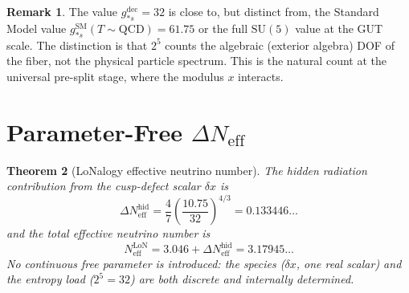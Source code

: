 \documentclass[12pt]{article}
\theoremstyle{plain}
\newtheorem{theorem}{Theorem}[section]
\theoremstyle{definition}
\newtheorem{remark}[theorem]{Remark}
\numberwithin{equation}{section}
\newcommand{\eff}{\mathrm{eff}}
\newcommand{\LoN}{\mathrm{LoN}}
\newcommand{\hid}{\mathrm{hid}}
\newcommand{\dec}{\mathrm{dec}}
\begin{document}
\begin{remark}
The value $g_{*s}^{\dec}=32$ is close to, but distinct from, the Standard
Model value $g_{*s}^{\mathrm{SM}}(T\sim\mathrm{QCD})=61.75$ or the
full $\mathrm{SU}(5)$ value at the GUT scale.  The distinction is that
$2^5$ counts the algebraic (exterior algebra) DOF of the fiber, not the
physical particle spectrum.  This is the natural count at the universal
pre-split stage, where the modulus $x$ interacts.
\end{remark}


\section{Parameter-Free $\Delta N_{\eff}$}\label{sec:Neff}

\begin{theorem}[LoNalogy effective neutrino number]\label{thm:Neff}
The hidden radiation contribution from the cusp-defect scalar
$\delta x$ is
\begin{equation}\label{eq:dNeff}
\boxed{\Delta N_{\eff}^{\hid} = \frac{4}{7}\left(\frac{10.75}{32}\right)^{4/3}
= 0.133446\ldots}
\end{equation}
and the total effective neutrino number is
\begin{equation}\label{eq:Neff}
\boxed{N_{\eff}^{\LoN} = 3.046 + \Delta N_{\eff}^{\hid} = 3.17945\ldots}
\end{equation}
No continuous free parameter is introduced: the species ($\delta x$, one
real scalar) and the entropy load ($2^5=32$) are both discrete and
internally determined.
\end{theorem}
\end{document}
